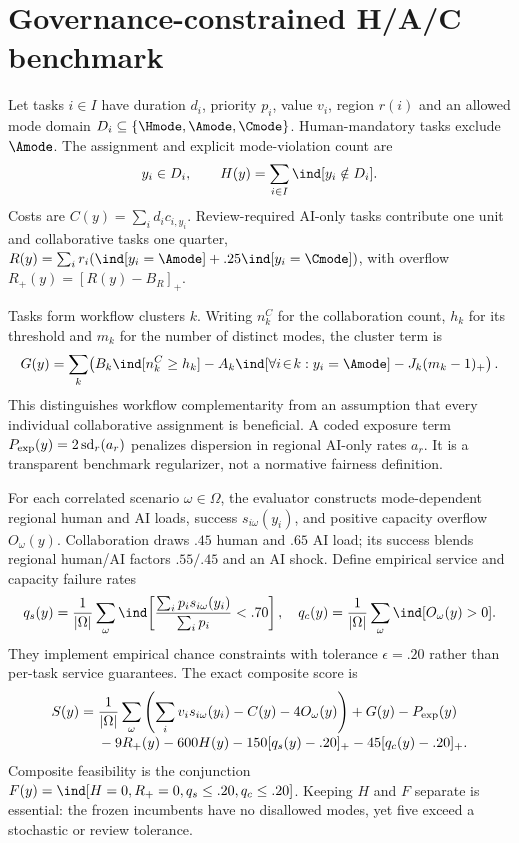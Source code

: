 \section{Governance-constrained H/A/C benchmark}
\label{sec:benchmark}

Let tasks $i\in I$ have duration $d_i$, priority $p_i$, value $v_i$, region $r(i)$ and an allowed mode domain $D_i\subseteq\{\Hmode,\Amode,\Cmode\}$. Human-mandatory tasks exclude $\Amode$. The assignment and explicit mode-violation count are
\begin{equation}
 y_i\in D_i,\qquad H(y)=\sum_{i\in I}\ind[y_i\notin D_i].
 \label{eq:mode}
\end{equation}
Costs are $C(y)=\sum_i d_i c_{i,y_i}$. Review-required AI-only tasks contribute one unit and collaborative tasks one quarter,
$R(y)=\sum_i r_i(\ind[y_i=\Amode]+.25\ind[y_i=\Cmode])$, with overflow $R_+(y)=[R(y)-B_R]_+$.

Tasks form workflow clusters $k$. Writing $n_k^C$ for the collaboration count, $h_k$ for its threshold and $m_k$ for the number of distinct modes, the cluster term is
\begin{equation}
 G(y)=\sum_k\!\left(B_k\ind[n_k^C\ge h_k]-A_k\ind[\forall i\!\in\!k:y_i=\Amode]-J_k(m_k-1)_+\right).
 \label{eq:cluster}
\end{equation}
This distinguishes workflow complementarity from an assumption that every individual collaborative assignment is beneficial. A coded exposure term $P_{\rm exp}(y)=2\operatorname{sd}_{r}(a_r)$ penalizes dispersion in regional AI-only rates $a_r$. It is a transparent benchmark regularizer, not a normative fairness definition.

For each correlated scenario $\omega\in\Omega$, the evaluator constructs mode-dependent regional human and AI loads, success $s_{i\omega}(y_i)$, and positive capacity overflow $O_\omega(y)$. Collaboration draws $.45$ human and $.65$ AI load; its success blends regional human/AI factors $.55/.45$ and an AI shock. Define empirical service and capacity failure rates
\begin{equation}
 q_s(y)=\frac1{|\Omega|}\sum_\omega \ind\!\left[\frac{\sum_i p_i s_{i\omega}(y_i)}{\sum_i p_i}<.70\right],\quad
 q_c(y)=\frac1{|\Omega|}\sum_\omega\ind[O_\omega(y)>0].
 \label{eq:chance}
\end{equation}
They implement empirical chance constraints with tolerance $\epsilon=.20$ rather than per-task service guarantees. The exact composite score is
\begin{align}
 S(y)={}&\frac1{|\Omega|}\sum_\omega\left(\sum_i v_i s_{i\omega}(y_i)-C(y)-4O_\omega(y)\right)+G(y)-P_{\rm exp}(y) \nonumber\\[-1mm]
 &-9R_+(y)-600H(y)-150[q_s(y)-.20]_+-45[q_c(y)-.20]_+ .
 \label{eq:score}
\end{align}
Composite feasibility is the conjunction $F(y)=\ind[H=0,R_+=0,q_s\le.20,q_c\le.20]$. Keeping $H$ and $F$ separate is essential: the frozen incumbents have no disallowed modes, yet five exceed a stochastic or review tolerance.

